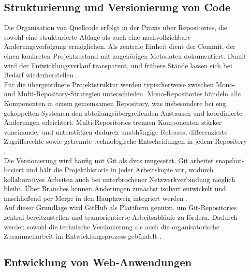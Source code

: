 \subsection{Strukturierung und Versionierung von Code}
\label{sec:structure-code-with-repositories}
\label{sec:git-github}

Die Organisation von Quellcode erfolgt in der Praxis über Repositories, die sowohl eine strukturierte Ablage als auch eine nachvollziehbare Änderungsverfolgung ermöglichen. 
Als zentrale Einheit dient der Commit, der einen konkreten Projektzustand mit zugehörigen Metadaten dokumentiert. 
Damit wird der Entwicklungsverlauf transparent, und frühere Stände lassen sich bei Bedarf wiederherstellen \cite{chacon2014progit}. \\

Für die übergeordnete Projektstruktur werden typischerweise zwischen Mono- und Multi-Repository-Strategien unterschieden. 
Mono-Repositories bündeln alle Komponenten in einem gemeinsamen Repository, was insbesondere bei eng gekoppelten Systemen den abteilungsübergreifenden Austausch und koordinierte Änderungen erleichtert. 
Multi-Repositories trennen Komponenten stärker voneinander und unterstützen dadurch unabhängige Releases, differenzierte Zugriffsrechte sowie getrennte technologische Entscheidungen in jedem Repository \cite{losoviz2023monorepovsmultirepo}. \\

Die Versionierung wird häufig mit Git als \gls{dvcs} umgesetzt. 
Git arbeitet snapshot-basiert und hält die Projekthistorie in jeder Arbeitskopie vor, wodurch kollaboratives Arbeiten auch bei unterbrochener Netzwerkverbindung möglich bleibt. 
Über Branches können Änderungen zunächst isoliert entwickelt und anschließend per Merge in den Hauptzweig integriert werden \cite{chacon2014progit}. \\

Auf dieser Grundlage wird GitHub als Plattform genutzt, um Git-Repositories zentral bereitzustellen und teamorientierte Arbeitsabläufe zu fördern. 
Dadurch werden sowohl die technische Versionierung als auch die organisatorische Zusammenarbeit im Entwicklungsprozess gebündelt \cite{losoviz2023monorepovsmultirepo}.

\subsection{Entwicklung von Web-Anwendungen}
\label{sec:web-development}

